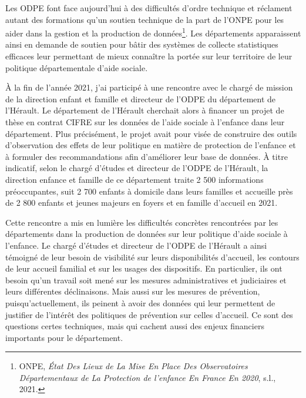 \documentclass[
  12,
  a4paper,
]{report}
\begin{document}
Les ODPE font face aujourd'hui à des difficultés d'ordre technique et
réclament autant des formations qu'un soutien technique de la part de
l'ONPE pour les aider dans la gestion et la production de
données\footnote{ONPE, \emph{État Des Lieux de La Mise En Place Des
  Observatoires Départementaux de La Protection de l'enfance En {France}
  En 2020}, s.l., 2021.}. Les départements apparaissent ainsi en demande
de soutien pour bâtir des systèmes de collecte statistiques efficaces
leur permettant de mieux connaître la portée sur leur territoire de leur
politique départementale d'aide sociale.

\begin{mdframed}[frametitle=Exemple d’une rencontre avec un chargé de mission de la direction enfance et famille et de l’ODPE du département de l’Hérault]

À la fin de l’année 2021, j’ai participé à une rencontre avec le chargé de mission de la direction enfant et famille et directeur de l’ODPE du département de l’Hérault. Le département de l’Hérault cherchait alors à financer un projet de thèse en contrat CIFRE sur les données de l’aide sociale à l’enfance dans leur département. Plus précisément, le projet avait pour visée de construire des outils d’observation des effets de leur politique en matière de protection de l’enfance et à formuler des recommandations afin d’améliorer leur base de données. À titre indicatif, selon le chargé d’études et directeur de l’ODPE de l’Hérault, la direction enfance et famille de ce département traite 2 500 informations préoccupantes, suit 2 700 enfants à domicile dans leurs familles et accueille près de 2 800 enfants et jeunes majeurs en foyers et en famille d’accueil en 2021.

Cette rencontre a mis en lumière les difficultés concrètes rencontrées par les départements dans la production de données sur leur politique d’aide sociale à l’enfance. Le chargé d’études et directeur de l’ODPE de l’Hérault a ainsi témoigné de leur besoin de visibilité sur leurs disponibilités d’accueil, les contours de leur accueil familial et sur les usages des dispositifs. En particulier, ils ont besoin qu’un travail soit mené sur les mesures administratives et judiciaires et leurs différentes déclinaisons. Mais aussi sur les mesures de prévention, puisqu’actuellement, ils peinent à avoir des données qui leur permettent de justifier de l’intérêt des politiques de prévention sur celles d’accueil. Ce sont des questions certes techniques, mais qui cachent aussi des enjeux financiers importants pour le département.


\end{mdframed}
\end{document}
